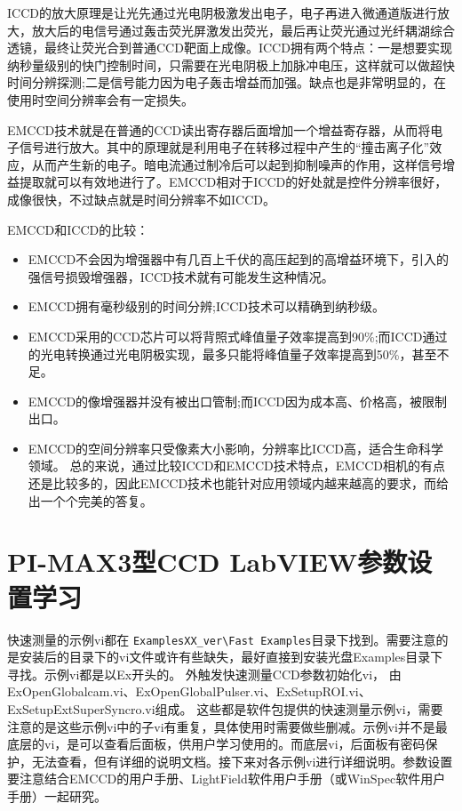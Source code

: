 ICCD的放大原理是让光先通过光电阴极激发出电子，电子再进入微通道版进行放大，放大后的电信号通过轰击荧光屏激发出荧光，最后再让荧光通过光纤耦湖综合透镜，最终让荧光合到普通CCD靶面上成像。ICCD拥有两个特点：一是想要实现纳秒量级别的快门控制时间，只需要在光电阴极上加脉冲电压，这样就可以做超快时间分辨探测;二是信号能力因为电子轰击增益而加强。缺点也是非常明显的，在使用时空间分辨率会有一定损失。

EMCCD技术就是在普通的CCD读出寄存器后面增加一个增益寄存器，从而将电子信号进行放大。其中的原理就是利用电子在转移过程中产生的“撞击离子化”效应，从而产生新的电子。暗电流通过制冷后可以起到抑制噪声的作用，这样信号增益提取就可以有效地进行了。EMCCD相对于ICCD的好处就是控件分辨率很好，成像很快，不过缺点就是时间分辨率不如ICCD。

EMCCD和ICCD的比较：
\begin{itemize}
\item EMCCD不会因为增强器中有几百上千伏的高压起到的高增益环境下，引入的强信号损毁增强器，ICCD技术就有可能发生这种情况。
\item EMCCD拥有毫秒级别的时间分辨;ICCD技术可以精确到纳秒级。
\item EMCCD采用的CCD芯片可以将背照式峰值量子效率提高到90\%;而ICCD通过的光电转换通过光电阴极实现，最多只能将峰值量子效率提高到50\%，甚至不足。
\item EMCCD的像增强器并没有被出口管制;而ICCD因为成本高、价格高，被限制出口。
\item EMCCD的空间分辨率只受像素大小影响，分辨率比ICCD高，适合生命科学领域。
总的来说，通过比较ICCD和EMCCD技术特点，EMCCD相机的有点还是比较多的，因此EMCCD技术也能针对应用领域内越来越高的要求，而给出一个个完美的答复。
\end{itemize}




\section{PI-MAX3型CCD LabVIEW参数设置学习}
快速测量的示例vi都在 \verb|ExamplesXX_ver\Fast Examples|目录下找到。需要注意的是安装后的目录下的vi文件或许有些缺失，最好直接到安装光盘Examples目录下寻找。示例vi都是以Ex开头的。
%
外触发快速测量CCD参数初始化vi，
由ExOpenGlobalcam.vi、ExOpenGlobalPulser.vi、ExSetupROI.vi、ExSetupExtSuperSyncro.vi组成。
这些都是软件包提供的快速测量示例vi，需要注意的是这些示例vi中的子vi有重复，具体使用时需要做些删减。示例vi并不是最底层的vi，是可以查看后面板，供用户学习使用的。而底层vi，后面板有密码保护，无法查看，但有详细的说明文档。接下来对各示例vi进行详细说明。参数设置要注意结合EMCCD的用户手册、LightField软件用户手册（或WinSpec软件用户手册）一起研究。

